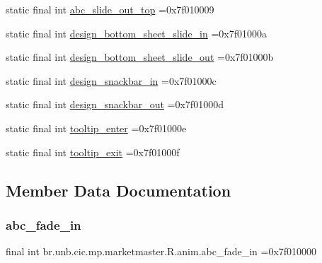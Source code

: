 \begin{DoxyCompactItemize}
\item 
static final int \mbox{\hyperlink{classbr_1_1unb_1_1cic_1_1mp_1_1marketmaster_1_1R_1_1anim_a9cf9691d0049074543741b2967682091}{abc\+\_\+slide\+\_\+out\+\_\+top}} =0x7f010009
\item 
static final int \mbox{\hyperlink{classbr_1_1unb_1_1cic_1_1mp_1_1marketmaster_1_1R_1_1anim_adb6aa95b609da3a5718e4d1eba99f05f}{design\+\_\+bottom\+\_\+sheet\+\_\+slide\+\_\+in}} =0x7f01000a
\item 
static final int \mbox{\hyperlink{classbr_1_1unb_1_1cic_1_1mp_1_1marketmaster_1_1R_1_1anim_a035ce1f35d61bedb8358ae0bb711e7b5}{design\+\_\+bottom\+\_\+sheet\+\_\+slide\+\_\+out}} =0x7f01000b
\item 
static final int \mbox{\hyperlink{classbr_1_1unb_1_1cic_1_1mp_1_1marketmaster_1_1R_1_1anim_ad951e44b71979135bf89dbbffb5fb995}{design\+\_\+snackbar\+\_\+in}} =0x7f01000c
\item 
static final int \mbox{\hyperlink{classbr_1_1unb_1_1cic_1_1mp_1_1marketmaster_1_1R_1_1anim_accfabb7532c71eb2b31ca39c6782525a}{design\+\_\+snackbar\+\_\+out}} =0x7f01000d
\item 
static final int \mbox{\hyperlink{classbr_1_1unb_1_1cic_1_1mp_1_1marketmaster_1_1R_1_1anim_a6239cb740eb68336cca566406122e0ce}{tooltip\+\_\+enter}} =0x7f01000e
\item 
static final int \mbox{\hyperlink{classbr_1_1unb_1_1cic_1_1mp_1_1marketmaster_1_1R_1_1anim_a01528168d5a511fbbba2b2de6ad70d5c}{tooltip\+\_\+exit}} =0x7f01000f
\end{DoxyCompactItemize}


\subsection{Member Data Documentation}
\mbox{\label{classbr_1_1unb_1_1cic_1_1mp_1_1marketmaster_1_1R_1_1anim_afd9b1d23ef3072fcd1d7bad946c28fe3}} 
\subsubsection{\texorpdfstring{abc\+\_\+fade\+\_\+in}{abc\_fade\_in}}
{\footnotesize\ttfamily final int br.\+unb.\+cic.\+mp.\+marketmaster.\+R.\+anim.\+abc\+\_\+fade\+\_\+in =0x7f010000\hspace{0.3cm}{\ttfamily [static]}}

